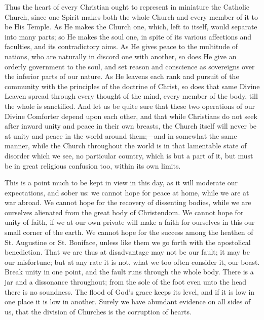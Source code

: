 Thus the heart of every Christian ought to represent in miniature
the Catholic Church, since one Spirit makes both the whole Church and
every member of it to be His Temple. As He makes the Church one,
which, left to itself, would separate into many parts; so He makes the
soul one, in spite of its various affections and faculties, and its
contradictory aims. As He gives peace to the multitude of nations, who
are naturally in discord one with another, so does He give an orderly
government to the soul, and set reason and conscience as sovereigns
over the inferior parts of our nature. As He leavens each rank and
pursuit of the community with the principles of the doctrine of
Christ, so does that same Divine Leaven spread through every thought
of the mind, every member of the body, till the whole is sanctified.
And let us be quite sure that these two operations of our Divine
Comforter depend upon each other, and that while Christians do not
seek after inward unity and peace in their own breasts, the Church
itself will never be at unity and peace in the world around them;—and
in somewhat the same manner, while the Church throughout the world is
in that lamentable state of disorder which we see, no particular
country, which is but a part of it, but must be in great religious
confusion too, within its own limits.

This is a point much to be kept in view in this day, as it will
moderate our expectations, and sober us: we cannot hope for peace at
home, while we are at war abroad. We cannot hope for the recovery of
dissenting bodies, while we are ourselves alienated from the great
body of Christendom. We cannot hope for unity of faith, if we at our
own private will make a faith for ourselves in this our small corner
of the earth. We cannot hope for the success among the heathen of St.
Augustine or St. Boniface, unless like them we go forth with the
apostolical benediction. That we are thus at disadvantage may not be
our fault; it may be our misfortune; but at any rate it is not, what
we too often consider it, our boast. Break unity in one point, and the
fault runs through the whole body. There is a jar and a dissonance
throughout; from the sole of the foot even unto the head there is no
soundness. The flood of God's grace keeps its level, and if it is low
in one place it is low in another. Surely we have abundant evidence on
all sides of us, that the division of Churches is the corruption of
hearts.

